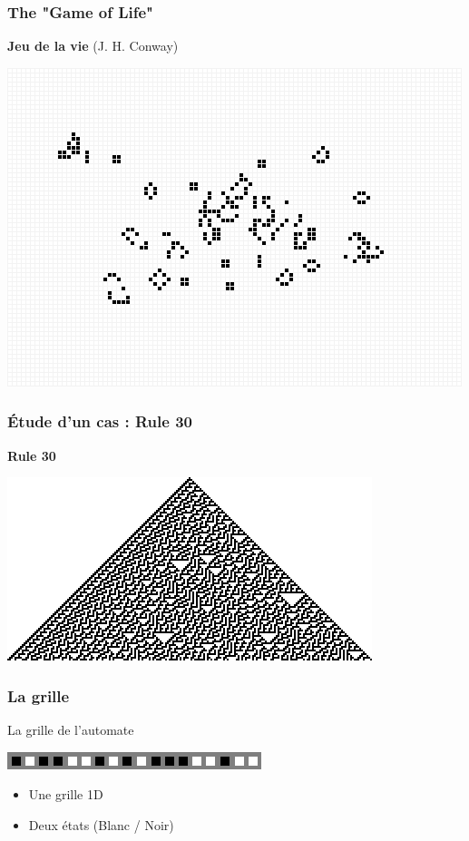 \documentclass{beamer}
\begin{document}
\begin{frame}
\frametitle{The "Game of Life"}
\begin{center}
\textbf{Jeu de la vie} (J. H. Conway)
\end{center}
\begin{center}
\includegraphics[scale=0.5]{game_of_life.png}
\end{center}
\end{frame}

\begin{frame}
\frametitle{Étude d'un cas : Rule 30}
\begin{center}
\textbf{Rule 30}
\end{center}
\begin{center}
\includegraphics[scale=1]{rule30.png}
\end{center}
\end{frame}

\begin{frame}
\frametitle{La grille}
\begin{block}{La grille de l'automate}
\begin{center}
\includegraphics[scale=0.5]{grid.png}
\end{center}
\end{block}
\begin{itemize}
	\item Une grille 1D
	\item Deux états (Blanc / Noir)
\end{itemize}
\end{frame}
\end{document}
